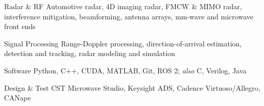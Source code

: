 %


\begin{cvskills}

    \cvskill
        {Radar \& RF}
        {Automotive radar, 4D imaging radar, FMCW \& MIMO radar, interference mitigation, beamforming, antenna arrays, mm-wave and microwave front ends}

    \cvskill
        {Signal Processing}
        {Range-Doppler processing, direction-of-arrival estimation, detection and tracking, radar modeling and simulation}

    \cvskill
        {Software}
        {Python, C++, CUDA, MATLAB, Git, ROS 2; \emph{also} C, Verilog, Java}

    \cvskill
        {Design \& Test}
        {CST Microwave Studio, Keysight ADS, Cadence Virtuoso/Allegro, CANape}

\end{cvskills}
